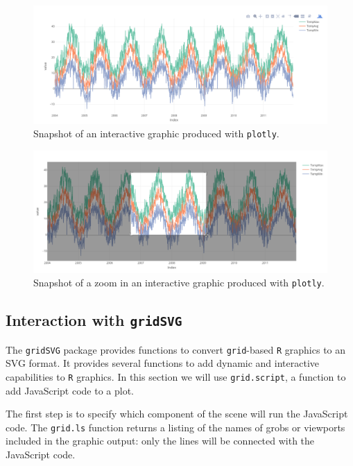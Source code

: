 \begin{figure}[htbp]
\centering
\includegraphics[width=.9\linewidth]{figs/plotly_aranjuez.png}
\caption{Snapshot of an interactive graphic produced with \texttt{plotly}. \label{fig:plotly}}
\end{figure}

\begin{figure}[htbp]
\centering
\includegraphics[width=.9\linewidth]{figs/plotly_aranjuez_zoom.png}
\caption{Snapshot of a zoom in an interactive graphic produced with \texttt{plotly}. \label{fig:plotly_zoom}}
\end{figure}


\subsection{\floweroneleft Interaction with \texttt{gridSVG}}
\label{sec:org6a8643f}
The \texttt{gridSVG} package provides functions to convert \texttt{grid}-based \texttt{R}
graphics to an SVG format. It provides several functions to add
dynamic and interactive capabilities to \texttt{R} graphics. In this section
we will use \texttt{grid.script}, a function to add JavaScript code to a
plot.

The first step is to specify which component of the scene
will run the JavaScript code. The \texttt{grid.ls} function  returns a
listing of the names of grobs or viewports included in the graphic
output: only the lines will be connected with the JavaScript
code. 


